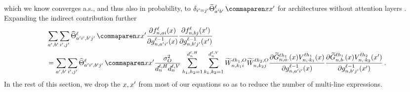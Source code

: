 which we know converges a.s., and thus also in probability, to $\delta_{\gIndexZA = \gIndexZB} \ntktildef{\gIndexA \gIndexB}{\depthSymbol}{\inputSymbol}{\inputSymbol'}$ for architectures without attention layers \citep{yang2019v2}.
Expanding the indirect contribution further
\begin{align*}
    &\sum_{\gIndexA, \gIndexB}
    \sum_{\gIndexZA, \gIndexZB}
        \ntkhatf{
            \gIndexA \gIndexZA , \gIndexB \gIndexZB
        }{\depthSymbol}{\inputSymbol}{\inputSymbol'}
        \frac{
            \partial \indexedActivation{\depthSymbol}{\sequenceVariable, \fIndexA i}{\inputSymbol}
        }{
            \partial \indexedActivity{\depthSymbol - 1}{\sequenceVariable, \gIndexA \gIndexZA}{\inputSymbol}
        }
        \frac{
            \partial \indexedActivation{\depthSymbol}{\sequenceVariable, \fIndexB j}{\inputSymbol'}
        }{
            \partial \indexedActivity{\depthSymbol - 1}{\sequenceVariable, \gIndexB \gIndexZB}{\inputSymbol'}
        }
    \\
    &=
    \sum_{\gIndexA, \gIndexB}
    \sum_{\gIndexZA, \gIndexZB}
        \ntkhatf{
            \gIndexA \gIndexZA , \gIndexB \gIndexZB
        }{\depthSymbol}{\inputSymbol}{\inputSymbol'}
        \frac{\outVar}{\headDimension \valueDimension}
        \sum_{\headIndex_1, \headIndex_2 = 1}^{\headDimension}
        \sum_{k_1, k_2 = 1}^{\valueDimension}
            \uW_{\sequenceVariable , k_1 i}^{\depthSymbol \headIndex_1 , \outputSymbol}
            \uW_{\sequenceVariable , k_2 j}^{\depthSymbol \headIndex_2 , \outputSymbol}
            \frac{
                \partial
                \tildeLogitN{\sequenceVariable , \fIndexA \cdot}{\depthSymbol \headIndex_1}{\inputSymbol}
                \val{\sequenceVariable, \cdot k_1}{\depthSymbol \headIndex_1} (\inputSymbol)
            }{
                \partial \indexedActivity{\depthSymbol - 1}{\sequenceVariable, \gIndexA \gIndexZA}{\inputSymbol}
            }
            \frac{
                \partial
                \tildeLogitN{\sequenceVariable , \fIndexB \cdot}{\depthSymbol \headIndex_1}{\inputSymbol}
                \val{\sequenceVariable, \cdot k_2}{\depthSymbol \headIndex_2} (\inputSymbol')
            }{
                \partial \indexedActivity{\depthSymbol - 1}{\sequenceVariable, \gIndexB \gIndexZB}{\inputSymbol'}
            }
    \, .
\end{align*}
In the rest of this section, we drop the $x, x'$ from most of our equations so as to reduce the number of multi-line expressions.

